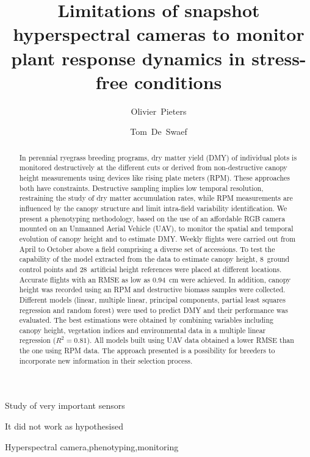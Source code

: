 \documentclass[10pt,authoryear,a4paper,review]{elsarticle}
\begin{document}
\begin{frontmatter}

    \title{Limitations of snapshot hyperspectral cameras to monitor plant response dynamics in stress-free conditions}
    
    \author[a,b]{Olivier~Pieters}
    
    \author[b]{Tom~De~Swaef}
    
    \address[a]{Ugent, Zwijnaarde}
    \address[b]{ILVO, Melle}
    
    \begin{abstract}
        In perennial ryegrass breeding programs, dry matter yield (DMY) of
        individual plots is monitored destructively at the different cuts or
        derived from non-destructive canopy height measurements using devices
        like rising plate meters (RPM). These approaches both have constraints.
        Destructive sampling implies low temporal resolution, restraining the
        study of dry matter accumulation rates, while RPM measurements are
        influenced by the canopy structure and limit intra-field variability
        identification. We present a phenotyping methodology, based on the use
        of an affordable RGB camera mounted on an Unmanned Aerial Vehicle (UAV),
        to monitor the spatial and temporal evolution of canopy height and to
        estimate DMY. Weekly flights were carried out from April to October
        above a field comprising a diverse set of accessions. To test the
        capability of the model extracted from the data to estimate canopy height, 
        8~ground control points and 28~artificial height references were placed 
        at different locations. Accurate flights with an RMSE as low as 0.94~cm were
        achieved. In addition, canopy height was recorded using an RPM and
        destructive biomass samples were collected. Different models (linear,
        multiple linear, principal components, partial least squares regression
        and random forest) were used to predict DMY and their performance was
        evaluated. The best estimations were obtained by combining variables
        including canopy height, vegetation indices and environmental data in a
        multiple linear regression (${R^2 = 0.81}$). All models built using UAV data
        obtained a lower RMSE than the one using RPM data. The approach
        presented is a possibility for breeders to incorporate new information
        in their selection process.
    \end{abstract}
    
    \begin{highlights}
        \item Study of very important sensors
        \item It did not work as hypothesised
    \end{highlights}
    
    \begin{keyword}
        Hyperspectral camera\sep phenotyping\sep monitoring
    \end{keyword}

\end{frontmatter}
\end{document}
